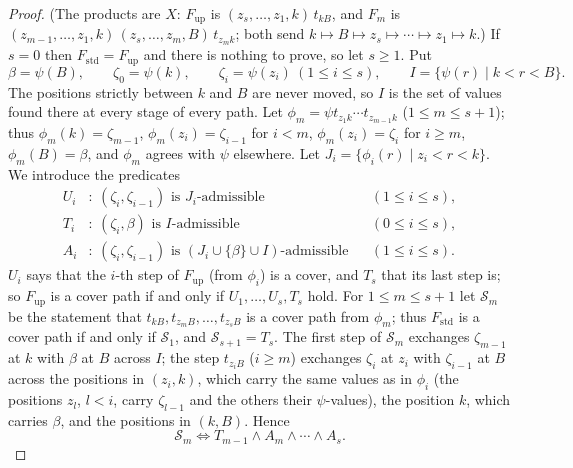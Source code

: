 \documentclass{amsart}
\theoremstyle{definition}
\theoremstyle{remark}
\numberwithin{equation}{section}
\begin{document}
\begin{proof}
(The products are $X$: $F_{\mathrm{up}}$ is $(z_s,\ldots,z_1,k)\,t_{kB}$, and $F_m$ is $(z_{m-1},\ldots,z_1,k)\,(z_s,\ldots,z_m,B)\,t_{z_mk}$; both send $k\mapsto B\mapsto z_s\mapsto\cdots\mapsto z_1\mapsto k$.) If $s=0$ then $F_{\mathrm{std}}=F_{\mathrm{up}}$ and there is nothing to prove, so let $s\geq1$. Put
$$\beta=\psi(B),\qquad \zeta_0=\psi(k),\qquad \zeta_i=\psi(z_i)\ (1\leq i\leq s),\qquad I=\{\psi(r)\mid k<r<B\}.$$
The positions strictly between $k$ and $B$ are never moved, so $I$ is the set of values found there at every stage of every path. Let $\phi_m=\psi t_{z_1k}\cdots t_{z_{m-1}k}$ ($1\leq m\leq s+1$); thus $\phi_m(k)=\zeta_{m-1}$, $\phi_m(z_i)=\zeta_{i-1}$ for $i<m$, $\phi_m(z_i)=\zeta_i$ for $i\geq m$, $\phi_m(B)=\beta$, and $\phi_m$ agrees with $\psi$ elsewhere. Let $J_i=\{\phi_i(r)\mid z_i<r<k\}$. We introduce the predicates
\begin{align*}
U_i&:\ (\zeta_i,\zeta_{i-1})\text{ is }J_i\text{-admissible} &&(1\leq i\leq s),\\
T_i&:\ (\zeta_i,\beta)\text{ is }I\text{-admissible} &&(0\leq i\leq s),\\
A_i&:\ (\zeta_i,\zeta_{i-1})\text{ is }(J_i\cup\{\beta\}\cup I)\text{-admissible} &&(1\leq i\leq s).
\end{align*}
$U_i$ says that the $i$-th step of $F_{\mathrm{up}}$ (from $\phi_i$) is a cover, and $T_s$ that its last step is; so $F_{\mathrm{up}}$ is a cover path if and only if $U_1,\ldots,U_s,T_s$ hold. For $1\leq m\leq s+1$ let $\mathcal S_m$ be the statement that $t_{kB},t_{z_mB},\ldots,t_{z_sB}$ is a cover path from $\phi_m$; thus $F_{\mathrm{std}}$ is a cover path if and only if $\mathcal S_1$, and $\mathcal S_{s+1}=T_s$. The first step of $\mathcal S_m$ exchanges $\zeta_{m-1}$ at $k$ with $\beta$ at $B$ across $I$; the step $t_{z_iB}$ ($i\geq m$) exchanges $\zeta_i$ at $z_i$ with $\zeta_{i-1}$ at $B$ across the positions in $(z_i,k)$, which carry the same values as in $\phi_i$ (the positions $z_l$, $l<i$, carry $\zeta_{l-1}$ and the others their $\psi$-values), the position $k$, which carries $\beta$, and the positions in $(k,B)$. Hence
$$\mathcal S_m\iff T_{m-1}\wedge A_m\wedge\cdots\wedge A_s.$$

\end{proof}
\end{document}
